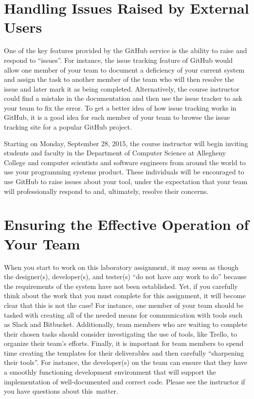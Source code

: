 \vspace*{-.05in}
\section*{Handling Issues Raised by External Users}

One of the key features provided by the GitHub service is the ability to raise and respond to ``issues''. For instance,
the issue tracking feature of GitHub would allow one member of your team to document a deficiency of your current system
and assign the task to another member of the team who will then resolve the issue and later mark it as being completed.
Alternatively, the course instructor could find a mistake in the documentation and then use the issue tracker to ask
your team to fix the error. To get a better idea of how issue tracking works in GitHub, it is a good idea for each
member of your team to browse the issue tracking site for a popular GitHub project.

Starting on Monday, September 28, 2015, the course instructor will begin inviting students and faculty in the Department
of Computer Science at Allegheny College and computer scientists and software engineers from around the world to use your
programming systems product. These individuals will be encouraged to use GitHub to raise issues about your tool, under
the expectation that your team will professionally respond to and, ultimately, resolve their concerns.

\section*{Ensuring the Effective Operation of Your Team}

When you start to work on this laboratory assignment, it may seem as though the designer(s), developer(s), and tester(s)
``do not have any work to do'' because the requirements of the system have not been established. Yet, if you carefully
think about the work that you must complete for this assignment, it will become clear that this is not the case! For
instance, one member of your team should be tasked with creating all of the needed means for communication with tools
such as Slack and Bitbucket. Additionally, team members who are waiting to complete their chosen tasks should consider
investigating the use of tools, like Trello, to organize their team's efforts. Finally, it is important for team
members to spend time creating the templates for their deliverables and then carefully ``sharpening their tools''. For
instance, the developer(s) on the team can ensure that they have a smoothly functioning development environment that
will support the implementation of well-documented and correct code. Please see the instructor if you have questions
about \mbox{this matter}.

